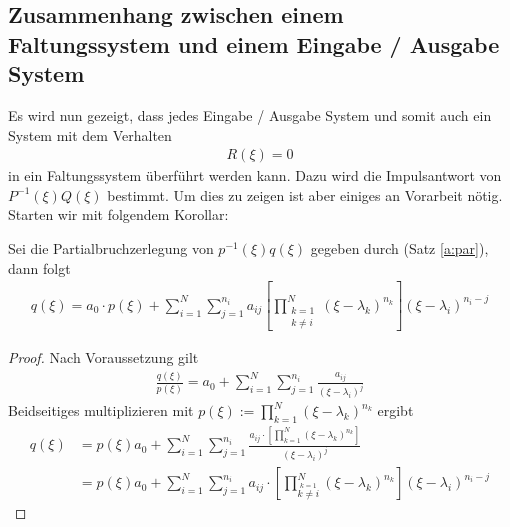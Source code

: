 \subsection{Zusammenhang zwischen einem Faltungssystem und einem Eingabe / Ausgabe System}
Es wird nun gezeigt, dass jedes Eingabe / Ausgabe System und somit auch ein System mit dem Verhalten
\begin{align}
	R(\xi) = 0
\end{align}
in ein Faltungssystem überführt werden kann. Dazu wird die Impulsantwort von $P^{-1}(\xi) Q(\xi)$ bestimmt. Um dies zu zeigen ist aber einiges an Vorarbeit nötig. Starten wir mit folgendem Korollar:
\begin{lemma}\label{sys:kor:part}
Sei die Partialbruchzerlegung von $p^{-1}(\xi)q(\xi)$ gegeben durch (Satz \ref{a:par}), dann folgt
\begin{align}
	q(\xi) = a_0 \cdot p(\xi) + \sum_{i=1}^{N}{\sum^{n_i}_{j=1}{a_{ij}\left[\prod_{\substack{k= 1\\k \neq i}}^N (\xi -\lambda_k)^{n_{k}}\right] (\xi -\lambda_i)^{n_{i}-j}}}
\end{align}
\begin{proof}
	Nach Voraussetzung gilt 
	\begin{align}
		\frac{q(\xi)}{p(\xi)} = a_0 + \sum_{i=1}^{N}{\sum_{j=1}^{n_i}{\frac{a_{ij}}{(\xi - \lambda_i)^j}}}
	\end{align}
	Beidseitiges multiplizieren mit $p(\xi):= \prod_{k=1}^N{(\xi -\lambda_k)^{n_k}}$ ergibt
	\begin{align}
		q(\xi) &= p(\xi) a_0 + \sum_{i=1}^{N}{\sum_{j=1}^{n_i}{\frac{a_{ij} \cdot \left[\prod_{k=1}^N{(\xi -\lambda_k)^{n_k}}\right]}{(\xi - \lambda_i)^j}}}\\
		&=p(\xi) a_0 + \sum_{i=1}^{N}{\sum_{j=1}^{n_i}{ a_{ij} \cdot \left[\prod_{\stackrel{k=1}{k \neq i} }^N{(\xi -\lambda_k)^{n_k}}\right]}{(\xi - \lambda_i)^{n_i- j}}}
	\end{align}
\end{proof}
\end{lemma}
